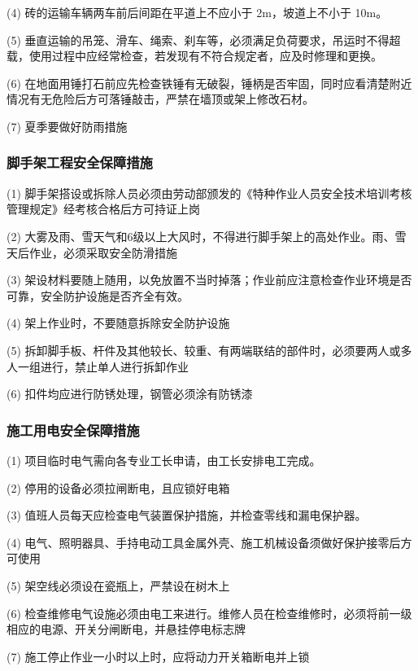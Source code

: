 (4) 砖的运输车辆两车前后间距在平道上不应小于 2m，坡道上不小于 10m。

(5) 垂直运输的吊笼、滑车、绳索、刹车等，必须满足负荷要求，吊运时不得超载，使用过程中应经常检查，若发现有不符合规定者，应及时修理和更换。

(6) 在地面用锤打石前应先检查铁锤有无破裂，锤柄是否牢固，同时应看清楚附近情况有无危险后方可落锤敲击，严禁在墙顶或架上修改石材。

(7) 夏季要做好防雨措施

\subsubsection{脚手架工程安全保障措施}

(1) 脚手架搭设或拆除人员必须由劳动部颁发的《特种作业人员安全技术培训考核管理规定》经考核合格后方可持证上岗

(2) 大雾及雨、雪天气和6级以上大风时，不得进行脚手架上的高处作业。雨、雪天后作业，必须采取安全防滑措施

(3) 架设材料要随上随用，以免放置不当时掉落；作业前应注意检查作业环境是否可靠，安全防护设施是否齐全有效。

(4) 架上作业时，不要随意拆除安全防护设施

(5) 拆卸脚手板、杆件及其他较长、较重、有两端联结的部件时，必须要两人或多人一组进行，禁止单人进行拆卸作业

(6) 扣件均应进行防锈处理，钢管必须涂有防锈漆

\subsubsection{施工用电安全保障措施}

(1) 项目临时电气需向各专业工长申请，由工长安排电工完成。

(2) 停用的设备必须拉闸断电，且应锁好电箱

(3) 值班人员每天应检查电气装置保护措施，并检查零线和漏电保护器。

(4) 电气、照明器具、手持电动工具金属外壳、施工机械设备须做好保护接零后方可使用

(5) 架空线必须设在瓷瓶上，严禁设在树木上

(6) 检查维修电气设施必须由电工来进行。维修人员在检查维修时，必须将前一级相应的电源、开关分闸断电，并悬挂停电标志牌

(7) 施工停止作业一小时以上时，应将动力开关箱断电并上锁

